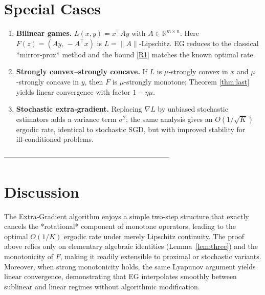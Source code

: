 \documentclass{article}
\newcommand{\RR}{\mathbb{R}}
\begin{document}
\section*{Special Cases}
\begin{enumerate}
\item \textbf{Bilinear games.} $L(x,y)=x^{\top}Ay$ with $A\in\RR^{m\times n}$. Here $F(z)=(Ay,\,-A^{\top}x)$ is $L=\|A\|$‑Lipschitz. EG reduces to the classical *mirror‑prox* method and the bound \eqref{R1} matches the known optimal rate.
\item \textbf{Strongly convex–strongly concave.} If $L$ is $\mu$‑strongly convex in $x$ and $\mu$‑strongly concave in $y$, then $F$ is $\mu$‑strongly monotone; Theorem \ref{thm:last} yields linear convergence with factor $1-\eta\mu$.
\item \textbf{Stochastic extra‑gradient.} Replacing $\nabla L$ by unbiased stochastic estimators adds a variance term $\sigma^{2}$; the same analysis gives an $O(1/\sqrt{K})$ ergodic rate, identical to stochastic SGD, but with improved stability for ill‑conditioned problems.
\end{enumerate}

---------------------------------------------------------------------

\section*{Discussion}
The Extra‑Gradient algorithm enjoys a simple two‑step structure that exactly cancels the *rotational* component of monotone operators, leading to the optimal $O(1/K)$ ergodic rate under merely Lipschitz continuity. The proof above relies only on elementary algebraic identities (Lemma~\ref{lem:three}) and the monotonicity of $F$, making it readily extensible to proximal or stochastic variants. Moreover, when strong monotonicity holds, the same Lyapunov argument yields linear convergence, demonstrating that EG interpolates smoothly between sublinear and linear regimes without algorithmic modification.
\end{document}
